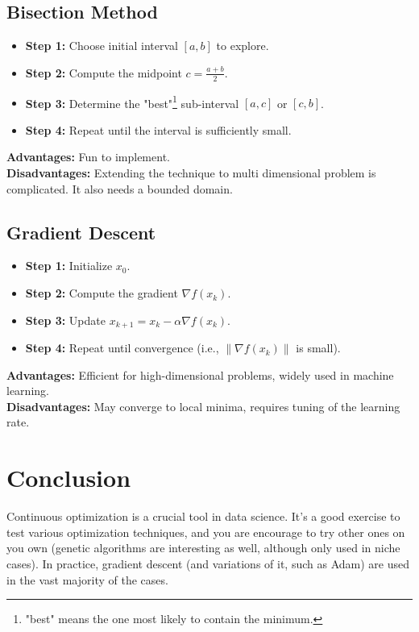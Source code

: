 \documentclass[]{article}
\begin{document}
	\subsection*{Bisection Method}
	\begin{itemize}
		\item \textbf{Step 1:} Choose initial interval $[a, b]$ to explore.
		\item \textbf{Step 2:} Compute the midpoint $c = \frac{a+b}{2}$.
		\item \textbf{Step 3:} Determine the "best"\footnote{"best" means the one most likely to contain the minimum.} sub-interval $[a, c]$ or $[c, b]$.
		\item \textbf{Step 4:} Repeat until the interval is sufficiently small.
	\end{itemize}
	\textbf{Advantages:} Fun to implement.
	\\
	\textbf{Disadvantages:} Extending the technique to multi dimensional problem is complicated.
	It also needs a bounded domain.
	
	\subsection*{Gradient Descent}
	\begin{itemize}
		\item \textbf{Step 1:} Initialize $x_0$.
		\item \textbf{Step 2:} Compute the gradient $\nabla f(x_k)$.
		\item \textbf{Step 3:} Update $x_{k+1} = x_k - \alpha \nabla f(x_k)$.
		\item \textbf{Step 4:} Repeat until convergence (i.e., $\|\nabla f(x_k)\|$ is small).
	\end{itemize}
	\textbf{Advantages:} Efficient for high-dimensional problems, widely used in machine learning.
	\\
	\textbf{Disadvantages:} May converge to local minima, requires tuning of the learning rate.
	
	\section*{Conclusion}
	Continuous optimization is a crucial tool in data science.
	It's a good exercise to test various optimization techniques, and you are encourage to try other ones on you own (genetic algorithms are interesting as well, although only used in niche cases).
	In practice, gradient descent (and variations of it, such as Adam) are used in the vast majority of the cases.
	
\end{document}
